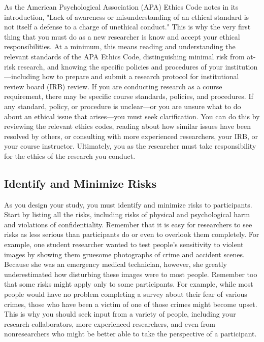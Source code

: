 As the American Psychological Association (APA) Ethics Code notes in its introduction, "Lack of awareness or misunderstanding of an ethical standard is not itself a defense to a charge of unethical conduct." This is why the very first thing that you must do as a new researcher is know and accept your ethical responsibilities. At a minimum, this means reading and understanding the relevant standards of the APA Ethics Code, distinguishing minimal risk from at-risk research, and knowing the specific policies and procedures of your institution---including how to prepare and submit a research protocol for institutional review board (IRB) review. If you are conducting research as a course requirement, there may be specific course standards, policies, and procedures. If any standard, policy, or procedure is unclear---or you are unsure what to do about an ethical issue that arises---you must seek clarification. You can do this by reviewing the relevant ethics codes, reading about how similar issues have been resolved by others, or consulting with more experienced researchers, your IRB, or your course instructor. Ultimately, you as the researcher must take responsibility for the ethics of the research you conduct.


\subsection{Identify and Minimize Risks}


As you design your study, you must identify and minimize risks to participants. Start by listing all the risks, including risks of physical and psychological harm and violations of confidentiality. Remember that it is easy for researchers to see risks as less serious than participants do or even to overlook them completely. For example, one student researcher wanted to test people's sensitivity to violent images by showing them gruesome photographs of crime and accident scenes. Because she was an emergency medical technician, however, she greatly underestimated how disturbing these images were to most people. Remember too that some risks might apply only to some participants. For example, while most people would have no problem completing a survey about their fear of various crimes, those who have been a victim of one of those crimes might become upset. This is why you should seek input from a variety of people, including your research collaborators, more experienced researchers, and even from nonresearchers who might be better able to take the perspective of a participant.


